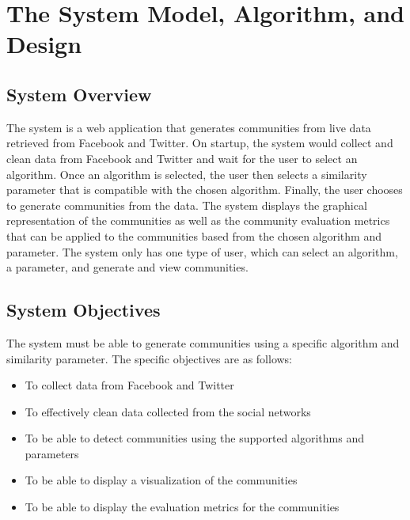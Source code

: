 %
%
%                 

\chapter{The System Model, Algorithm, and Design}
\label{sec:sysmodel}

\section{System Overview}
The system is a web application that generates communities from live data retrieved from Facebook and Twitter. 
On startup, the system would collect and clean data from Facebook and Twitter and wait for the user to select 
an algorithm. Once an algorithm is selected, the user then selects a similarity parameter that is compatible
with the chosen algorithm. Finally, the user chooses to generate communities from the data. The system displays 
the graphical representation of the communities as well as the community evaluation metrics that can be applied 
to the communities based from the chosen algorithm and parameter. The system only has one type of user, which 
can select an algorithm, a parameter, and generate and view communities.

\section{System Objectives}
The system must be able to generate communities using a specific algorithm and similarity parameter. The specific objectives are as follows:

\begin{itemize}
	\item To collect data from Facebook and Twitter
	\item To effectively clean data collected from the social networks
	\item To be able to detect communities using the supported algorithms and parameters
	\item To be able to display a visualization of the communities
	\item To be able to display the evaluation metrics for the communities
\end{itemize}

